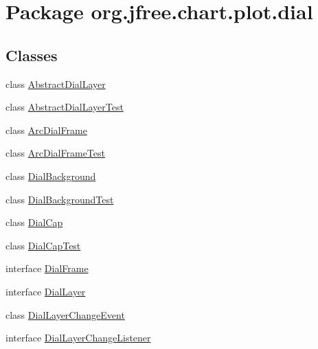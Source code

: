 \hypertarget{namespaceorg_1_1jfree_1_1chart_1_1plot_1_1dial}{}\section{Package org.\+jfree.\+chart.\+plot.\+dial}
\label{namespaceorg_1_1jfree_1_1chart_1_1plot_1_1dial}
\subsection*{Classes}
\begin{DoxyCompactItemize}
\item 
class \mbox{\hyperlink{classorg_1_1jfree_1_1chart_1_1plot_1_1dial_1_1_abstract_dial_layer}{Abstract\+Dial\+Layer}}
\item 
class \mbox{\hyperlink{classorg_1_1jfree_1_1chart_1_1plot_1_1dial_1_1_abstract_dial_layer_test}{Abstract\+Dial\+Layer\+Test}}
\item 
class \mbox{\hyperlink{classorg_1_1jfree_1_1chart_1_1plot_1_1dial_1_1_arc_dial_frame}{Arc\+Dial\+Frame}}
\item 
class \mbox{\hyperlink{classorg_1_1jfree_1_1chart_1_1plot_1_1dial_1_1_arc_dial_frame_test}{Arc\+Dial\+Frame\+Test}}
\item 
class \mbox{\hyperlink{classorg_1_1jfree_1_1chart_1_1plot_1_1dial_1_1_dial_background}{Dial\+Background}}
\item 
class \mbox{\hyperlink{classorg_1_1jfree_1_1chart_1_1plot_1_1dial_1_1_dial_background_test}{Dial\+Background\+Test}}
\item 
class \mbox{\hyperlink{classorg_1_1jfree_1_1chart_1_1plot_1_1dial_1_1_dial_cap}{Dial\+Cap}}
\item 
class \mbox{\hyperlink{classorg_1_1jfree_1_1chart_1_1plot_1_1dial_1_1_dial_cap_test}{Dial\+Cap\+Test}}
\item 
interface \mbox{\hyperlink{interfaceorg_1_1jfree_1_1chart_1_1plot_1_1dial_1_1_dial_frame}{Dial\+Frame}}
\item 
interface \mbox{\hyperlink{interfaceorg_1_1jfree_1_1chart_1_1plot_1_1dial_1_1_dial_layer}{Dial\+Layer}}
\item 
class \mbox{\hyperlink{classorg_1_1jfree_1_1chart_1_1plot_1_1dial_1_1_dial_layer_change_event}{Dial\+Layer\+Change\+Event}}
\item 
interface \mbox{\hyperlink{interfaceorg_1_1jfree_1_1chart_1_1plot_1_1dial_1_1_dial_layer_change_listener}{Dial\+Layer\+Change\+Listener}}
\item 

\end{DoxyCompactItemize}

